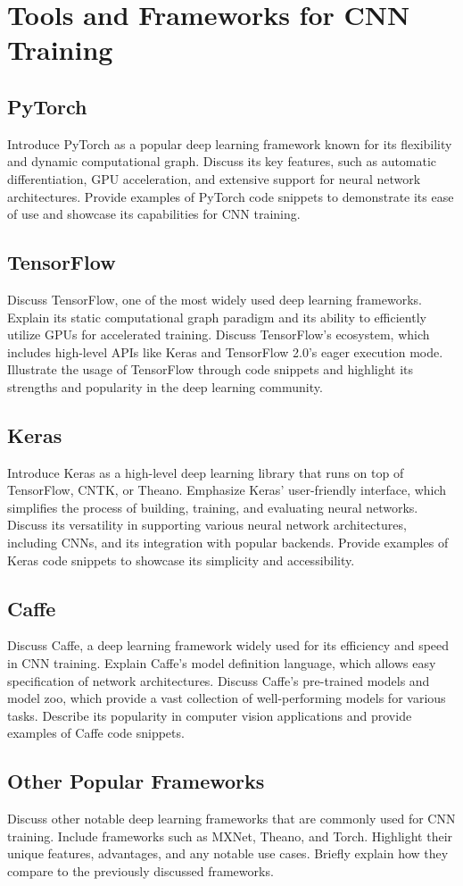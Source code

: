 

\chapter{Tools and Frameworks for CNN Training}

\section{PyTorch}
Introduce PyTorch as a popular deep learning framework known for its flexibility and dynamic computational graph. Discuss its key features, such as automatic differentiation, GPU acceleration, and extensive support for neural network architectures. Provide examples of PyTorch code snippets to demonstrate its ease of use and showcase its capabilities for CNN training.

\section{TensorFlow}
Discuss TensorFlow, one of the most widely used deep learning frameworks. Explain its static computational graph paradigm and its ability to efficiently utilize GPUs for accelerated training. Discuss TensorFlow's ecosystem, which includes high-level APIs like Keras and TensorFlow 2.0's eager execution mode. Illustrate the usage of TensorFlow through code snippets and highlight its strengths and popularity in the deep learning community.

\section{Keras}
Introduce Keras as a high-level deep learning library that runs on top of TensorFlow, CNTK, or Theano. Emphasize Keras' user-friendly interface, which simplifies the process of building, training, and evaluating neural networks. Discuss its versatility in supporting various neural network architectures, including CNNs, and its integration with popular backends. Provide examples of Keras code snippets to showcase its simplicity and accessibility.

\section{Caffe}
Discuss Caffe, a deep learning framework widely used for its efficiency and speed in CNN training. Explain Caffe's model definition language, which allows easy specification of network architectures. Discuss Caffe's pre-trained models and model zoo, which provide a vast collection of well-performing models for various tasks. Describe its popularity in computer vision applications and provide examples of Caffe code snippets.

\section{Other Popular Frameworks}
Discuss other notable deep learning frameworks that are commonly used for CNN training. Include frameworks such as MXNet, Theano, and Torch. Highlight their unique features, advantages, and any notable use cases. Briefly explain how they compare to the previously discussed frameworks.
